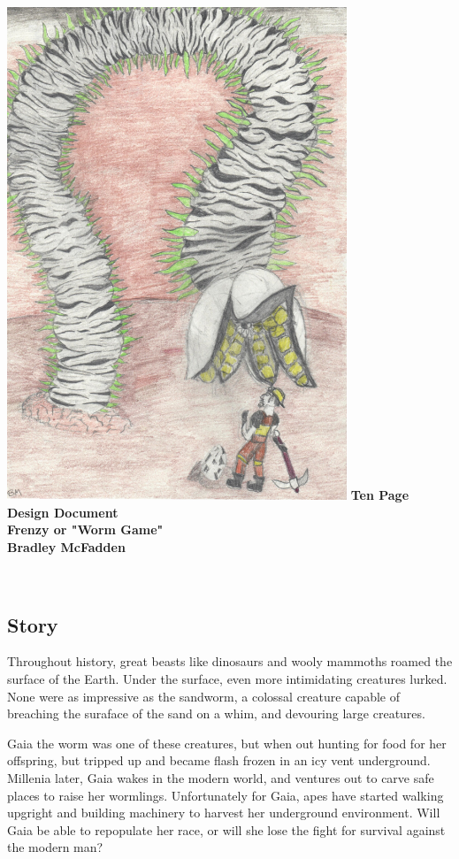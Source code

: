 \documentclass[12pt]{report}
\begin{document}
\pagestyle{plain}

\begin{titlepage}
    \centering
    \vfill
    \includegraphics[width=4in]{img/worm_burst.jpeg}
    \vfill
    {\bfseries\Large
        Ten Page Design Document\\
        Frenzy or "Worm Game"\\
        \vskip2cm
        Bradley McFadden\\
    }
    \vfill
\end{titlepage}
~
\subsection*{Story}
Throughout history, great beasts like dinosaurs and wooly mammoths
roamed the surface of the Earth. Under the surface, even more 
intimidating creatures lurked. None were as impressive as the
sandworm, a colossal creature capable of breaching the suraface of 
the sand on a whim, and devouring large creatures.

Gaia the worm was one of these creatures, but when out hunting for
food for her offspring, but tripped up and became flash frozen in 
an icy vent underground. Millenia later, Gaia wakes in the modern
world, and ventures out to carve safe places to raise her wormlings.
Unfortunately for Gaia, apes have started walking upgright and
building machinery to harvest her underground environment. Will Gaia
be able to repopulate her race, or will she lose the fight for 
survival against the modern man?
\end{document}

